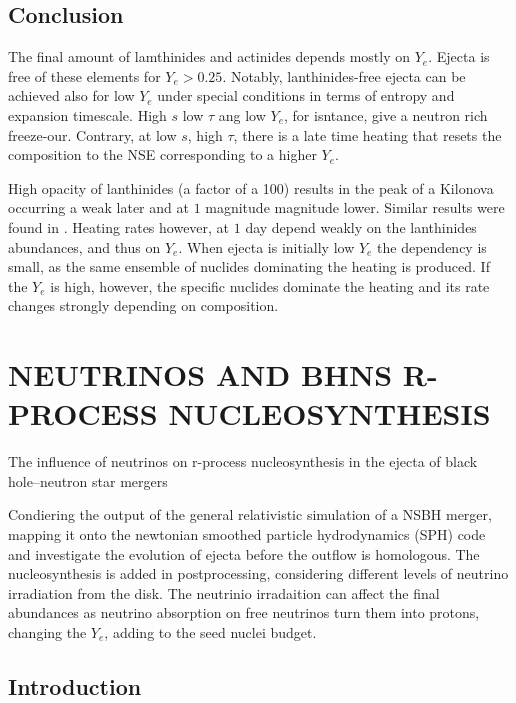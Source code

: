 \documentclass[11pt,a4paper,headinclude=true,DIV=14,BCOR=8mm,chapterprefix,listof=totoc,twoside,openright,abstracton]{scrbook}
\begin{document}

\subsection{Conclusion}

The final amount of lamthinides and actinides depends mostly on $Y_e$. Ejecta is free of these elements for $Y_e > 0.25$. Notably, lanthinides-free ejecta can be achieved also for low $Y_e$ under special conditions in terms of entropy and expansion timescale. High $s$ low $\tau$ ang low $Y_e$, for isntance, give a neutron rich freeze-our. Contrary, at low $s$, high $\tau$, there is a late time heating that resets the composition to the NSE corresponding to a higher $Y_e$. 

High opacity of lanthinides (a factor of a 100) results in the peak of a Kilonova occurring a weak later and at $1$ magnitude magnitude lower. Similar results were found in \cite{Roberts et al. (2011), Kasen et al. (2013), Tanaka and Hotokezaka (2013), and Grossman et al. (2014).}. Heating rates however, at $1$ day depend weakly on the lanthinides abundances, and thus on $Y_e$. When ejecta is initially low $Y_e$ the dependency is small, as the same ensemble of nuclides dominating the heating is produced. If the $Y_e$ is high, however, the specific nuclides dominate the heating and its rate changes strongly depending on composition. 


\section{NEUTRINOS AND BHNS R-PROCESS NUCLEOSYNTHESIS}

The influence of neutrinos on r-process nucleosynthesis
in the ejecta of black hole–neutron star mergers

Condiering the output of the general relativistic simulation of a NSBH merger, mapping it onto the newtonian smoothed particle hydrodynamics (SPH) code and investigate the evolution of ejecta before the outflow is homologous. The nucleosynthesis is added in postprocessing, considering different levels of neutrino irradiation from the disk. The neutrinio irradaition can affect the final abundances as neutrino absorption on free neutrinos turn them into protons, changing the $Y_e$, adding to the seed nuclei budget. 


\subsection{Introduction}
\end{document}
